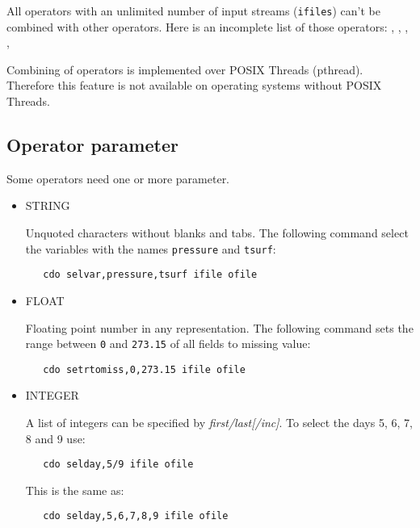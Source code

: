 All operators with an unlimited number of input streams ({\tt ifiles})
can't be combined with other operators. Here is an incomplete list
of those operators:
{\bf {}},
{\bf {}},
{\bf {}},
{\bf {}},
{\bf {}}

Combining of operators is implemented over POSIX Threads (pthread).
Therefore this {\CDO} feature is not available on operating systems 
without POSIX Threads.

\subsection{Operator parameter}

Some operators need one or more parameter.

\begin{itemize}
\item STRING

Unquoted characters without blanks and tabs.
The following command select the variables with the names {\tt pressure} and {\tt tsurf}:
\begin{verbatim}
   cdo selvar,pressure,tsurf ifile ofile
\end{verbatim}

\item FLOAT

Floating point number in any representation.
The following command sets the range between {\tt 0} and {\tt 273.15}
of all fields to missing value:
\begin{verbatim}
   cdo setrtomiss,0,273.15 ifile ofile
\end{verbatim}

\item INTEGER

A list of integers can be specified by {\it first/last[/inc]}.
To select the days 5, 6, 7, 8 and 9 use:
\begin{verbatim}
   cdo selday,5/9 ifile ofile
\end{verbatim}
This is the same as:
\begin{verbatim}
   cdo selday,5,6,7,8,9 ifile ofile
\end{verbatim}
\end{itemize}
